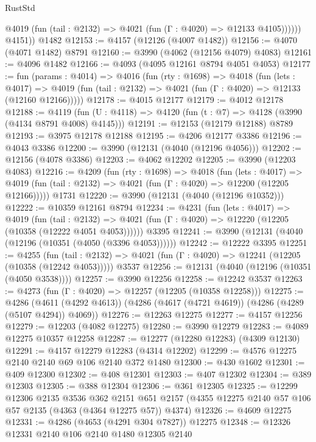 \begin{lexlean}{RustStd}
\begin{coremodule}
{\begin{coremodule}
{{{{{{{{{{{{{{{{              @4019 (fun (tail : @2132) => @4021 (fun (Γ : @4020) => @12133 @4105))))))
        @4151))
    @1482
@12153 := @4157 (@12126 (@4007 @1482))
@12156 := @4070 (@4071 @1482) @8791
@12160 := @3990 (@4062 (@12156 @4079) @4083)
@12161 := @4096 @1482
@12166 := @4093 (@4095 @12161 @8794 @4051 @4053)
@12177 := fun (params : @4014) =>
  @4016
    (fun (rty : @1698) =>
    @4018
      (fun (lets : @4017) =>
      @4019 (fun (tail : @2132) => @4021 (fun (Γ : @4020) => @12133 (@12160 @12166)))))
@12178 := @4015 @12177
@12179 := @4012 @12178
@12188 := @4119 (fun (U : @4118) => @4120 (fun (t : @7) => @4128 (@3990 (@4134 @8791 @4008) @4145)))
@12191 := @12153 (@12179 @12188) @8789
@12193 := @3975 @12178 @12188
@12195 := @4206 @12177 @3386
@12196 := @4043 @3386
@12200 := @3990 (@12131 (@4040 (@12196 @4056)))
@12202 := @12156 (@4078 @3386)
@12203 := @4062 @12202
@12205 := @3990 (@12203 @4083)
@12216 := @4209
    (fun (rty : @1698) =>
    @4018
      (fun (lets : @4017) =>
      @4019 (fun (tail : @2132) => @4021 (fun (Γ : @4020) => @12200 (@12205 @12166)))))
    @1731
@12220 := @3990 (@12131 (@4040 (@12196 @10352)))
@12222 := @10359 @12161 @8794
@12234 := @4231
    (fun (lets : @4017) =>
    @4019
      (fun (tail : @2132) =>
      @4021 (fun (Γ : @4020) => @12220 (@12205 (@10358 (@12222 @4051 @4053))))))
    @3395
@12241 := @3990 (@12131 (@4040 (@12196 (@10351 (@4050 (@3396 @4053))))))
@12242 := @12222 @3395
@12251 := @4255
    (fun (tail : @2132) => @4021 (fun (Γ : @4020) => @12241 (@12205 (@10358 (@12242 @4053)))))
    @3537
@12256 := @12131 (@4040 (@12196 (@10351 (@4050 @3538))))
@12257 := @3990 @12256
@12258 := @12242 @3537
@12263 := @4273 (fun (Γ : @4020) => @12257 (@12205 (@10358 @12258)))
@12275 := @4286
    (@4611 (@4292 @4613))
    (@4286 (@4617 (@4721 @4619)) (@4286 (@4289 (@5107 @4294)) @4069))
@12276 := @12263 @12275
@12277 := @4157 @12256
@12279 := @12203 (@4082 @12275)
@12280 := @3990 @12279
@12283 := @4089 @12275 @10357 @12258
@12287 := @12277 (@12280 @12283) (@4309 @12130)
@12291 := @4157 @12279 @12283 (@4314 @12202)
@12299 := @4576 @12275 @2140 @2140 @69 @106 @2140 @372 @1480
@12300 := @430 @1602
@12301 := @409 @12300
@12302 := @408 @12301
@12303 := @407 @12302
@12304 := @389 @12303
@12305 := @388 @12304
@12306 := @361 @12305
@12325 := @12299
    @12306
    @2135
    @3536
    @362
    @2151
    @651
    @2157
    (@4355 @12275 @2140 @57 @106 @57 @2135 (@4363 (@4364 @12275 @57)) @4374)
@12326 := @4609 @12275
@12331 := @4286 (@4653 (@4291 @304 @7827)) @12275
@12348 := @12326
    @12331
    @2140
    @106
    @2140
    @1480
    @12305
    @2140
}}}}}}}}}}}}}}}}
\end{coremodule}}
\end{coremodule}
\end{lexlean}
